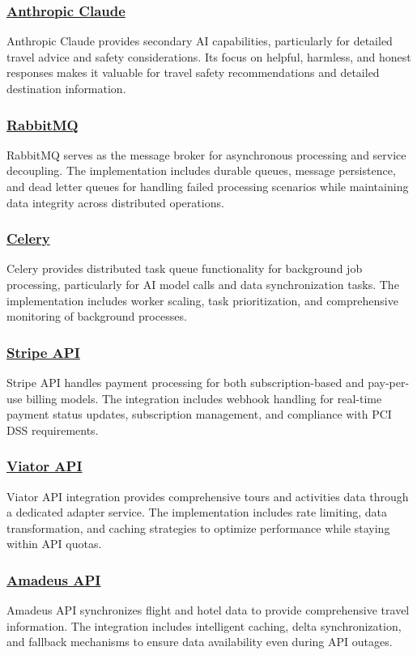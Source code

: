 \subsubsection*{\underline{Anthropic Claude}}
Anthropic Claude provides secondary AI capabilities, particularly for detailed travel advice and safety considerations. Its focus on helpful, harmless, and honest responses makes it valuable for travel safety recommendations and detailed destination information.

\subsubsection*{\underline{RabbitMQ}}
RabbitMQ serves as the message broker for asynchronous processing and service decoupling. The implementation includes durable queues, message persistence, and dead letter queues for handling failed processing scenarios while maintaining data integrity across distributed operations.

\subsubsection*{\underline{Celery}}
Celery provides distributed task queue functionality for background job processing, particularly for AI model calls and data synchronization tasks. The implementation includes worker scaling, task prioritization, and comprehensive monitoring of background processes.

\subsubsection*{\underline{Stripe API}}
Stripe API handles payment processing for both subscription-based and pay-per-use billing models. The integration includes webhook handling for real-time payment status updates, subscription management, and compliance with PCI DSS requirements.

\subsubsection*{\underline{Viator API}}
Viator API integration provides comprehensive tours and activities data through a dedicated adapter service. The implementation includes rate limiting, data transformation, and caching strategies to optimize performance while staying within API quotas.

\subsubsection*{\underline{Amadeus API}}
Amadeus API synchronizes flight and hotel data to provide comprehensive travel information. The integration includes intelligent caching, delta synchronization, and fallback mechanisms to ensure data availability even during API outages.

